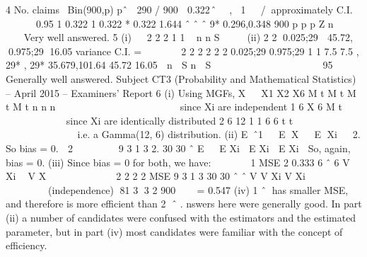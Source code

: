 \documentclass[a4paper,12pt]{article}
\begin{document}
  4 No. claims ~Bin(900,p)
pˆ  290 / 900  0.322
􀝌̂~􀜰􁈺􀝌, 􀝌􁈺1 􀵆 􀝌􁈻/􀝊􁈻approximately
C.I.
      0.95
1 0.322 1 0.322
* 0.322 1.644
ˆ ˆ
ˆ 9* 0.296,0.348
900
p p
p Z
n
 
    
Very well answered.
5 (i)
  2
2
2 1
1
~ n
n S




(ii) 2 2
0.025;29  45.72, 0.975;29 16.05
variance C.I. =
       
2 2 2 2
2 2
0.025;29 0.975;29
1 1 7.5 7.5 , 29* , 29* 35.679,101.64
45.72 16.05
 n  S n  S   
             
95%
Generally well answered.
Subject CT3 (Probability and Mathematical Statistics) – April 2015 – Examiners’ Report
6 (i) Using MGFs,
X   X1 X2 X6
M t M t M t M t
n n n
            
     
 since Xi are independent
1
6
X 6
M t
        
   
since Xi are identically distributed
2 6 12
1 1
6 6
t t             
    
i.e. a Gamma(12, 6) distribution.
(ii) Eˆ1   E X   E Xi   2. So bias = 0.
 2       
9 3 1 3 2.
30 30
ˆ E   E Xi  E Xi  E Xi  So, again, bias = 0.
(iii) Since bias = 0 for both, we have:
       
1
MSE 2 0.333
6
ˆ
6
V Xi
 V X   
       
2 2
2 2
MSE 9 3 1 3
30 30
ˆ ˆ V V Xi V Xi           
   
(independence)
81 3 3
2
900
 
 = 0.547
(iv) 1 ˆ has smaller MSE, and therefore is more efficient than 2 ˆ . nswers here were generally good. In part (ii) a number of candidates were confused with the estimators and the estimated parameter, but in part (iv) most candidates were familiar
with the concept of efficiency.
\end{document}
